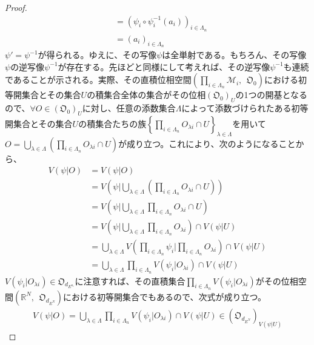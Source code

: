\documentclass[dvipdfmx]{jsarticle}
\begin{document}
\begin{proof}
\begin{align*}
&= \left( \psi_{i} \circ \psi_{i}^{- 1}\left( a_{i} \right) \right)_{i \in \varLambda_{n}}\\
&= \left( a_{i} \right)_{i \in \varLambda_{n}}
\end{align*}
$\psi' = \psi^{- 1}$が得られる。ゆえに、その写像$\psi$は全単射である。もちろん、その写像$\psi$の逆写像$\psi^{- 1}$が存在する。先ほどと同様にして考えれば、その逆写像$\psi^{- 1}$も連続であることが示される。実際、その直積位相空間$\left( \prod_{i \in \varLambda_{n}} \mathcal{M}_{i},\ \ \mathfrak{O}_{0} \right)$における初等開集合とその集合$U$の積集合全体の集合がその位相$\left( \mathfrak{O}_{0} \right)_{U}$の1つの開基となるので、$\forall O \in \left( \mathfrak{O}_{0} \right)_{U}$に対し、任意の添数集合$\varLambda$によって添数づけられたある初等開集合とその集合$U$の積集合たちの族$\left\{ \prod_{i \in \varLambda_{n}} O_{\lambda i} \cap U \right\}_{\lambda \in \varLambda}$を用いて$O = \bigcup_{\lambda \in \varLambda} \left( \prod_{i \in \varLambda_{n}} O_{\lambda i} \cap U \right)$が成り立つ。これにより、次のようになることから、
\begin{align*}
V\left( \psi|O \right) &= V\left( \psi|O \right)\\
&= V\left( \psi|\bigcup_{\lambda \in \varLambda} \left( \prod_{i \in \varLambda_{n}} O_{\lambda i} \cap U \right) \right)\\
&= V\left( \psi|\bigcup_{\lambda \in \varLambda} {\prod_{i \in \varLambda_{n}} O_{\lambda i}} \cap U \right)\\
&= V\left( \psi|\bigcup_{\lambda \in \varLambda} {\prod_{i \in \varLambda_{n}} O_{\lambda i}} \right) \cap V\left( \psi|U \right)\\
&= \bigcup_{\lambda \in \varLambda} {V\left( \prod_{i \in \varLambda_{n}} \psi_{i}|\prod_{i \in \varLambda_{n}} O_{\lambda i} \right)} \cap V\left( \psi|U \right)\\
&= \bigcup_{\lambda \in \varLambda} {\prod_{i \in \varLambda_{n}} {V\left( \psi_{i}|O_{\lambda i} \right)}} \cap V\left( \psi|U \right)
\end{align*}
$V\left( \psi_{i}|O_{\lambda i} \right) \in \mathfrak{O}_{d_{E^{n_{i}}}}$に注意すれば、その直積集合$\prod_{i \in \varLambda_{n}} {V\left( \psi_{i}|O_{\lambda i} \right)}$がその位相空間$\left( \mathbb{R}^{N},\ \ \mathfrak{O}_{d_{E^{N}}} \right)$における初等開集合でもあるので、次式が成り立つ。
\begin{align*}
V\left( \psi|O \right) = \bigcup_{\lambda \in \varLambda} {\prod_{i \in \varLambda_{n}} {V\left( \psi_{i}|O_{\lambda i} \right)}} \cap V\left( \psi|U \right) \in \left( \mathfrak{O}_{d_{E^{N}}} \right)_{V\left( \psi|U \right)}

\end{align*}
\end{proof}
\end{document}
